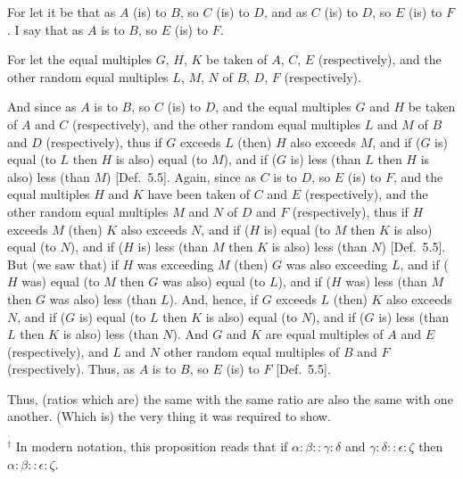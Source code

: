 \begin{Parallel}{}{}
{For let it be that as $A$ (is) to $B$, so $C$ (is) to $D$, and as $C$ (is) to $D$, so $E$ (is) to $F$. I say
that as  $A$ is to $B$, so $E$ (is) to $F$.

For let the equal multiples $G$, $H$,  $K$ be taken of $A$, $C$,  $E$ (respectively), and
the other random equal multiples $L$, $M$,  $N$ of $B$, $D$, $F$ (respectively).

\epsfysize=0.75in
\centerline{}

And since as $A$ is to $B$, so $C$ (is) to $D$, and the equal multiples $G$ and $H$
be taken of $A$ and $C$ (respectively), and the other random equal
multiples $L$ and $M$ of $B$ and $D$ (respectively),  thus if $G$ exceeds $L$ (then)
$H$ also exceeds $M$, and if ($G$ is) equal (to $L$ then $H$ is also)
equal (to $M$), and if ($G$ is) less (than $L$ then $H$ is also) less (than $M$)  [Def.~5.5]. Again, since as $C$ is to $D$, so $E$
(is) to $F$, and the equal multiples $H$ and $K$ have been taken of $C$ and $E$
(respectively), and the other random equal multiples $M$ and $N$ of
$D$ and $F$ (respectively), thus if $H$ exceeds $M$ (then)
$K$ also exceeds $N$, and if ($H$ is) equal  (to $M$ then $K$ is also)
equal (to $N$), and if ($H$ is) less (than $M$  then $K$ is also) less (than $N$) [Def.~5.5]. But (we saw that) if $H$ was exceeding $M$ (then) $G$ was also
exceeding $L$, and if ($H$ was) equal (to $M$ then $G$ was also)
equal (to $L$), and if ($H$ was) less (than $M$ then $G$ was also) less (than $L$).
And, hence, if $G$ exceeds $L$ (then)
$K$ also exceeds $N$, and if ($G$ is) equal (to $L$ then $K$ is also)  equal (to $N$), and if ($G$ is) less (than $L$ then $K$ is also) less (than $N$). And $G$ and $K$ are equal multiples of $A$ and $E$ (respectively), and $L$ and $N$
other random equal multiples of $B$ and $F$ (respectively). Thus, as $A$ is to $B$,
so $E$ (is) to $F$ [Def.~5.5].

Thus, (ratios which are) the same with the same ratio  are also the same with one another. (Which is) the very thing it was required to show.}
\end{Parallel}
{\footnotesize \noindent$^\dag$ In modern notation, this proposition
reads that if $\alpha:\beta::\gamma:\delta$ and $\gamma:\delta::\epsilon:\zeta$ then $\alpha:\beta::\epsilon:\zeta$.}

